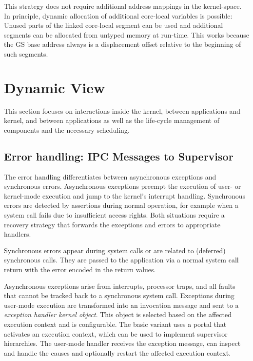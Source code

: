 This strategy does not require additional address mappings in the kernel-space. In principle, dynamic allocation of additional core-local variables is possible: Unused parts of the linked core-local segment can be used and additional segments can be allocated from untyped memory at run-time. This works because the GS base address always is a displacement offset relative to the beginning of such segments.


\section{Dynamic View}
\label{sec:global-dynamical-view}

This section focuses on interactions inside the kernel, between applications and kernel, and between applications as well as the life-cycle management of components and the necessary scheduling.

\subsection{Error handling: IPC Messages to Supervisor}
\label{sec:error-dyn}

The error handling differentiates between asynchronous exceptions and synchronous errors. Asynchronous exceptions preempt the execution of user- or kernel-mode execution and jump to the kernel's interrupt handling. Synchronous errors are detected by assertions during normal operation, for example when a system call fails due to insufficient access rights.
Both situations require a recovery strategy that forwards the exceptions and errors to appropriate handlers.

Synchronous errors appear during system calls or are related to (deferred) synchronous calls. They are passed to the application via a normal system call return with the error encoded in the return values.

Asynchronous exceptions arise from interrupts, processor traps, and all faults that cannot be tracked back to a synchronous system call. Exceptions during user-mode execution are transformed into an invocation message and sent to a \emph{exception handler kernel object}. This object is selected based on the affected execution context and is configurable. The basic variant uses a portal that activates an execution context, which can be used to implement supervisor hierarchies. The user-mode handler receives the exception message, can inspect and handle the causes and optionally restart the affected execution context.

